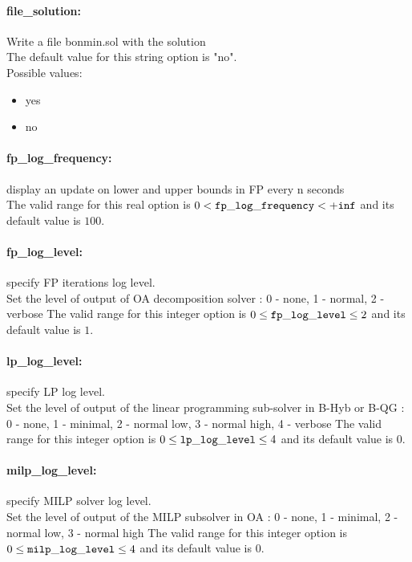 \paragraph{file\_solution:}\label{opt:file_solution} Write a file bonmin.sol with the solution \\
 The default value for this string option is "no".
\\ 
Possible values:
\begin{itemize}
   \item yes
   \item no
\end{itemize}

\paragraph{fp\_log\_frequency:}\label{opt:fp_log_frequency} display an update on lower and upper bounds in FP every n seconds \\
 The valid range for this real option is 
$0 <  {\tt fp\_log\_frequency } <  {\tt +inf}$
and its default value is $100$.


\paragraph{fp\_log\_level:}\label{opt:fp_log_level} specify FP iterations log level. \\
 Set the level of output of OA decomposition solver : 0 - none, 1 - normal, 2 - verbose The valid range for this integer option is
$0 \le {\tt fp\_log\_level } \le 2$
and its default value is $1$.


\paragraph{lp\_log\_level:}\label{opt:lp_log_level} specify LP log level. \\
 Set the level of output of the linear programming sub-solver in B-Hyb or B-QG : 0 - none, 1 - minimal, 2 - normal low, 3 - normal high, 4 - verbose The valid range for this integer option is
$0 \le {\tt lp\_log\_level } \le 4$
and its default value is $0$.


\paragraph{milp\_log\_level:}\label{opt:milp_log_level} specify MILP solver log level. \\
 Set the level of output of the MILP subsolver in OA : 0 - none, 1 - minimal, 2 - normal low, 3 - normal high The valid range for this integer option is
$0 \le {\tt milp\_log\_level } \le 4$
and its default value is $0$.


